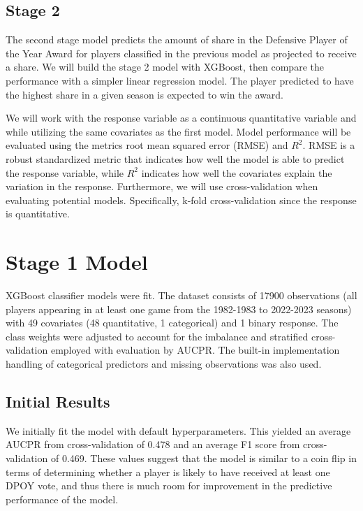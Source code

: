 \documentclass[letterpaper,titlepage]{article}
\begin{document}
    \subsection{Stage 2}
    The second stage model predicts the amount of share in the Defensive Player of the Year Award for players classified in the previous model as projected to receive a share. We will build the stage 2 model with XGBoost, then compare the performance with a simpler linear regression model. The player predicted to have the highest share in a given season is expected to win the award.
    
    We will work with the response variable as a continuous quantitative variable and while utilizing the same covariates as the first model. Model performance will be evaluated using the metrics root mean squared error (RMSE) and \(R^2\). RMSE is a robust standardized metric that indicates how well the model is able to predict the response variable, while \(R^2\) indicates how well the covariates explain the variation in the response. Furthermore, we will use cross-validation when evaluating potential models. Specifically, k-fold cross-validation since the response is quantitative.


    \section{Stage 1 Model}

    XGBoost classifier models were fit. The dataset consists of 17900 observations (all players appearing in at least one game from the 1982-1983 to 2022-2023 seasons) with 49 covariates (48 quantitative, 1 categorical) and 1 binary response. The class weights were adjusted to account for the imbalance and stratified cross-validation employed with evaluation by AUCPR. The built-in implementation handling of categorical predictors and missing observations was also used.

    \subsection{Initial Results}
    We initially fit the model with default hyperparameters. This yielded an average AUCPR from cross-validation of 0.478 and an average F1 score from cross-validation of 0.469. These values suggest that the model is similar to a coin flip in terms of determining whether a player is likely to have received at least one DPOY vote, and thus there is much room for improvement in the predictive performance of the model.
\end{document}
